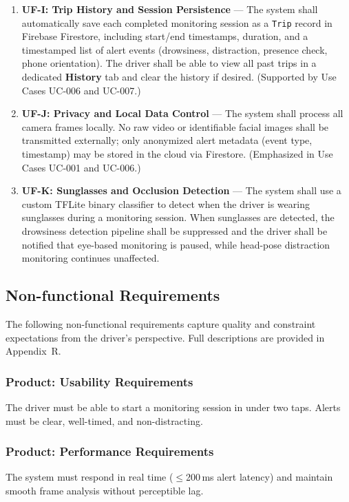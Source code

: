 \documentclass[11pt]{report}
\begin{document}
\begin{enumerate}
    \item \textbf{UF-I: Trip History and Session Persistence} —
    The system shall automatically save each completed monitoring session as a \texttt{Trip} record in Firebase Firestore, including start/end timestamps, duration, and a timestamped list of alert events (drowsiness, distraction, presence check, phone orientation). The driver shall be able to view all past trips in a dedicated \textbf{History} tab and clear the history if desired. (Supported by Use Cases UC-006 and UC-007.)

    \item \textbf{UF-J: Privacy and Local Data Control} —
    The system shall process all camera frames locally. No raw video or identifiable facial images shall be transmitted externally; only anonymized alert metadata (event type, timestamp) may be stored in the cloud via Firestore. (Emphasized in Use Cases UC-001 and UC-006.)

    \item \textbf{UF-K: Sunglasses and Occlusion Detection} —
    The system shall use a custom TFLite binary classifier to detect when the driver is wearing sunglasses during a monitoring session. When sunglasses are detected, the drowsiness detection pipeline shall be suppressed and the driver shall be notified that eye-based monitoring is paused, while head-pose distraction monitoring continues unaffected.

\end{enumerate}

\subsection{Non-functional Requirements}
The following non-functional requirements capture quality and constraint expectations from the driver's perspective. Full descriptions are provided in Appendix~R.

\subsubsection{Product: Usability Requirements}
The driver must be able to start a monitoring session in under two taps. Alerts must be clear, well-timed, and non-distracting.

\subsubsection{Product: Performance Requirements}
The system must respond in real time ($\leq$200\,ms alert latency) and maintain smooth frame analysis without perceptible lag.
\end{document}
